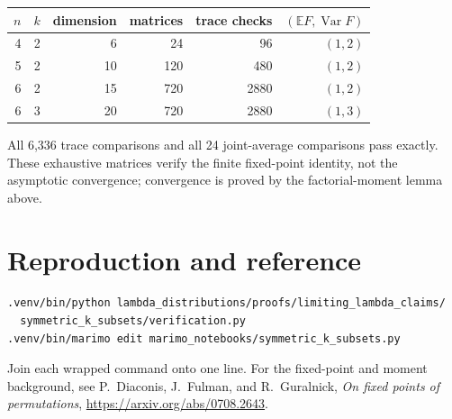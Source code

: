 \documentclass[11pt]{article}
\begin{document}
\begin{center}
\begin{tabular}{@{}rrrrrr@{}}\toprule
$n$&$k$&dimension&matrices&trace checks&$(\mathbb E F,\operatorname{Var}F)$\\\midrule
4&2&6&24&96&$(1,2)$\\
5&2&10&120&480&$(1,2)$\\
6&2&15&720&2880&$(1,2)$\\
6&3&20&720&2880&$(1,3)$\\\bottomrule
\end{tabular}
\end{center}
All 6,336 trace comparisons and all 24 joint-average comparisons pass exactly.
These exhaustive matrices verify the finite fixed-point identity, not the
asymptotic convergence; convergence is proved by the factorial-moment lemma
above.

\section{Reproduction and reference}
\begin{verbatim}
.venv/bin/python lambda_distributions/proofs/limiting_lambda_claims/
  symmetric_k_subsets/verification.py
.venv/bin/marimo edit marimo_notebooks/symmetric_k_subsets.py
\end{verbatim}
Join each wrapped command onto one line.  For the fixed-point and moment
background, see P.~Diaconis, J.~Fulman, and R.~Guralnick,
\emph{On fixed points of permutations},
\url{https://arxiv.org/abs/0708.2643}.
\end{document}
